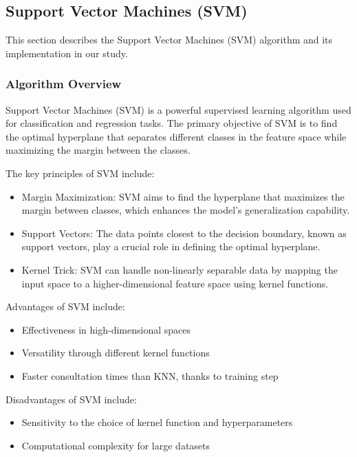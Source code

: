 \subsection{Support Vector Machines (SVM)}
\label{subsec:methods-svm}

This section describes the Support Vector Machines (SVM) algorithm and its implementation in our study.

\subsubsection{Algorithm Overview}

Support Vector Machines (SVM) is a powerful supervised learning algorithm used for classification and
regression tasks. The primary objective of SVM is to find the optimal hyperplane that separates different classes
in the feature space while maximizing the margin between the classes\cite{burges1998svmTutorial}.

The key principles of SVM include:

\begin{itemize}
    \item Margin Maximization: SVM aims to find the hyperplane that maximizes the margin between classes, which enhances the model's generalization capability.
    \item Support Vectors: The data points closest to the decision boundary, known as support vectors, play a crucial role in defining the optimal hyperplane.
    \item Kernel Trick: SVM can handle non-linearly separable data by mapping the input space to a higher-dimensional feature space using kernel functions.
\end{itemize}

Advantages of SVM include:
\begin{itemize}
    \item Effectiveness in high-dimensional spaces
    \item Versatility through different kernel functions
    \item Faster consultation times than KNN, thanks to training step
\end{itemize}

Disadvantages of SVM include:
\begin{itemize}
    \item Sensitivity to the choice of kernel function and hyperparameters
    \item Computational complexity for large datasets
\end{itemize}
